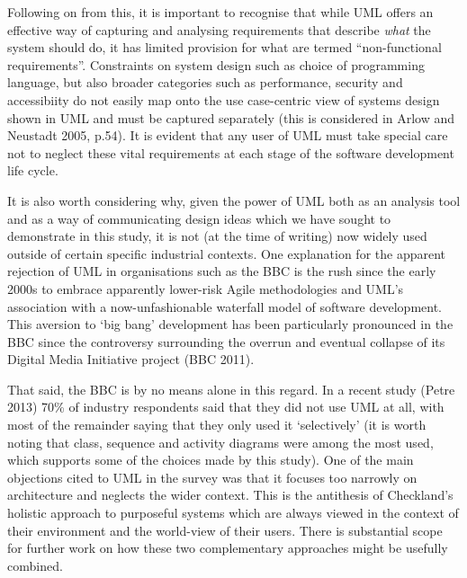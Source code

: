 \documentclass[runningheads,a4paper]{llncs}
\begin{document}
Following on from this, it is important to recognise that while UML offers an effective way of capturing and analysing requirements that describe \textit{what} the system should do, it has limited provision for what are termed ``non-functional requirements''. Constraints on system design such as choice of programming language, but also broader categories such as performance, security and accessibiity do not easily map onto the use case-centric view of systems design shown in UML and must be captured separately (this is considered in Arlow and Neustadt 2005, p.54). It is evident that any user of UML must take special care not to neglect these vital requirements at each stage of the software development life cycle.

It is also worth considering why, given the power of UML both as an analysis tool and as a way of communicating design ideas which we have sought to demonstrate in this study, it is not (at the time of writing) now widely used outside of certain specific industrial contexts. One explanation for the apparent rejection of UML in organisations such as the BBC is the rush since the early 2000s to embrace apparently lower-risk Agile methodologies and UML's association with a now-unfashionable waterfall model of software development. This aversion to `big bang' development has been particularly pronounced in the BBC since the controversy surrounding the overrun and eventual collapse of its Digital Media Initiative project (BBC 2011).

That said, the BBC is by no means alone in this regard. In a recent study (Petre 2013) 70\% of industry respondents said that they did not use UML at all, with most of the remainder saying that they only used it `selectively' (it is worth noting that class, sequence and activity diagrams were among the most used, which supports some of the choices made by this study). One of the main objections cited to UML in the survey was that it focuses too narrowly on architecture and neglects the wider context. This is the antithesis of Checkland's holistic approach to purposeful systems which are always viewed in the context of their environment and the world-view of their users. There is substantial scope for further work on how these two complementary approaches might be usefully combined.
\end{document}
